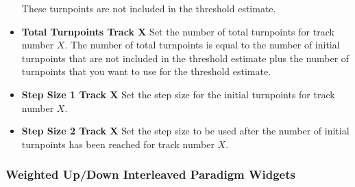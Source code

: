 \begin{itemize}
  These turnpoints are not included in the threshold estimate. 
\item \textbf{Total Turnpoints Track X} Set the number of total turnpoints for track number $X$. The number of total turnpoints is equal to the number of initial turnpoints that are not included in the threshold estimate
  plus the number of turnpoints that you want to use for the threshold estimate.
\item \textbf{Step Size 1 Track X} Set the step size for the initial turnpoints for track number $X$.
\item \textbf{Step Size 2 Track X} Set the step size to be used after the number of initial turnpoints has been reached for track number $X$.
\end{itemize}

\subsubsection{Weighted Up/Down Interleaved Paradigm Widgets}

